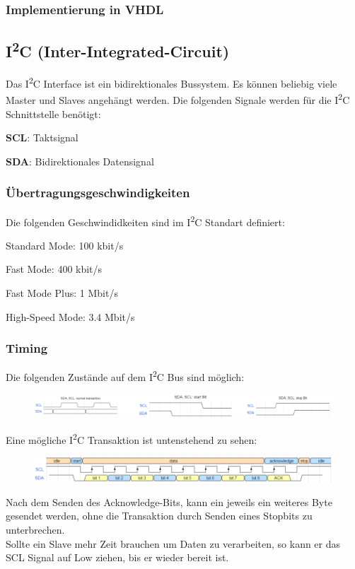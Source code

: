 \subsubsection{Implementierung in VHDL}


\subsection{I\textsuperscript{2}C (Inter-Integrated-Circuit)}
Das I\textsuperscript{2}C Interface ist ein bidirektionales Bussystem. Es können beliebig viele Master und Slaves angehängt werden. Die folgenden Signale werden für die I\textsuperscript{2}C Schnittstelle benötigt:
\begin{compactitem}
    \item \textbf{SCL}: Taktsignal
    \item \textbf{SDA}: Bidirektionales Datensignal   
\end{compactitem}

\subsubsection{Übertragungsgeschwindigkeiten}
Die folgenden Geschwindidkeiten sind im I\textsuperscript{2}C Standart definiert:
\begin{compactitem}
    \item Standard Mode: 100 kbit/s
    \item Fast Mode: 400 kbit/s
    \item Fast Mode Plus: 1 Mbit/s
    \item High-Speed Mode: 3.4 Mbit/s
\end{compactitem}

\subsubsection{Timing}
Die folgenden Zustände auf dem I\textsuperscript{2}C Bus sind möglich:
\begin{figure}[H]
    \includegraphics[width=1\textwidth]{images/i2c_bitstates.png}
\end{figure}
Eine mögliche I\textsuperscript{2}C Transaktion ist untenstehend zu sehen:
\begin{figure}[H]
    \includegraphics[width=1\textwidth]{images/i2c_timing.png}
\end{figure}
Nach dem Senden des Acknowledge-Bits, kann ein jeweils ein weiteres Byte gesendet werden, ohne die Transaktion durch Senden eines Stopbits zu unterbrechen. \\
Sollte ein Slave mehr Zeit brauchen um Daten zu verarbeiten, so kann er das SCL Signal auf Low ziehen, bis er wieder bereit ist.

